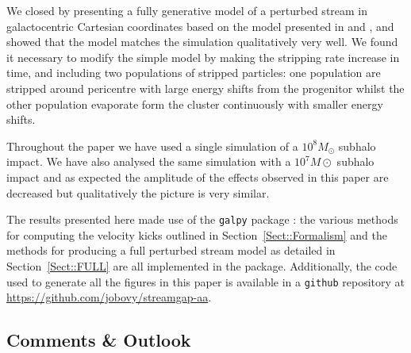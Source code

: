 \documentclass[useAMS,usenatbib,fleqn,a4paper]{mn2e}
\begin{document}
We closed by presenting a fully generative model of a perturbed stream in galactocentric Cartesian coordinates based on the model presented in \cite{Bovy2014} and \cite{Sanders2014}, and showed that the model matches the simulation qualitatively very well. We found it necessary to modify the simple model by making the stripping rate increase in time, and including two populations of stripped particles: one population are stripped around pericentre with large energy shifts from the progenitor whilst the other population evaporate form the cluster continuously with smaller energy shifts.

Throughout the paper we have used a single simulation of a $10^8M_\odot$ subhalo impact. We have also analysed the same simulation with a $10^7M\odot$ subhalo impact and as expected the amplitude of the effects observed in this paper are decreased but qualitatively the picture is very similar.

The results presented here made use of the \texttt{galpy} package \citep{galpy}: the various methods for computing the velocity kicks outlined in Section~\ref{Sect::Formalism} and the methods for producing a full perturbed stream model as detailed in Section~\ref{Sect::FULL} are all implemented in the package. Additionally, the code used to generate all the figures in this paper is available in a \texttt{github} repository at \href{https://github.com/jobovy/streamgap-aa}{https://github.com/jobovy/streamgap-aa}.

\subsection{Comments \& Outlook}
\end{document}

